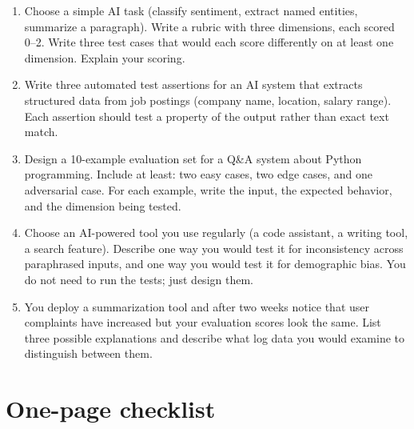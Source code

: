 \begin{enumerate}[noitemsep,topsep=0pt]
  \item Choose a simple AI task (classify sentiment, extract named entities, summarize a paragraph). Write a rubric with three dimensions, each scored 0--2. Write three test cases that would each score differently on at least one dimension. Explain your scoring.
  \item Write three automated test assertions for an AI system that extracts structured data from job postings (company name, location, salary range). Each assertion should test a property of the output rather than exact text match.
  \item Design a 10-example evaluation set for a Q\&A system about Python programming. Include at least: two easy cases, two edge cases, and one adversarial case. For each example, write the input, the expected behavior, and the dimension being tested.
  \item Choose an AI-powered tool you use regularly (a code assistant, a writing tool, a search feature). Describe one way you would test it for inconsistency across paraphrased inputs, and one way you would test it for demographic bias. You do not need to run the tests; just design them.
  \item You deploy a summarization tool and after two weeks notice that user complaints have increased but your evaluation scores look the same. List three possible explanations and describe what log data you would examine to distinguish between them.
\end{enumerate}

\section{One-page checklist}


